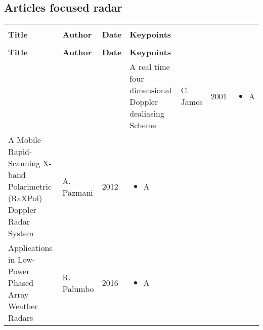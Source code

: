 \documentclass[12pt]{article}
\begin{document}
\subsection{Articles focused radar}
\begin{center}
\begin{longtable}{|p{4.5cm}|p{2cm}|p{0.8cm}|p{7.5cm}|}

\hline
 & & & \tabularnewline
\textbf{Title} & \textbf{Author} & \textbf{Date} & \textbf{Keypoints} \tabularnewline
 & & & \endfirsthead
 \hline
 
 \hline
 & & & \tabularnewline
\textbf{Title} & \textbf{Author} & \textbf{Date} & \textbf{Keypoints} \tabularnewline
 & & & \endhead
 \hline
 
 \hline
\endlastfoot
 \hline
 
 \hline
\endfoot
 \hline
 

\raggedright A real time four dimensional Doppler dealiasing Scheme & C. James & 2001 & \raggedleft 
\begin{itemize} 
\item A
\end{itemize} 
\tabularnewline

\hline



\raggedright A Mobile Rapid-Scanning X-band Polarimetric (RaXPol) Doppler Radar System & A. Pazmani & 2012 & \raggedleft 
\begin{itemize} 
\item A
\end{itemize} 
\tabularnewline

\hline

\raggedright Applications in Low-Power Phased Array Weather
Radars & R. Palumbo & 2016 & \raggedleft 
\begin{itemize} 
\item A
\end{itemize} 
\tabularnewline

\hline






\end{longtable}
\end{center}
\end{document}
